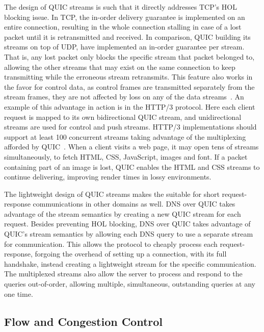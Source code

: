 \documentclass[english, 12pt, a4paper, elec, utf8, a-2b, online]{aaltothesis}
\begin{document}
The design of QUIC streams is such that it directly addresses TCP's HOL blocking
issue. In TCP, the in-order delivery guarantee is implemented on an entire connection,
resulting in the whole connection stalling in case of a lost packet until it is
retransmitted and received. In comparison, QUIC building its streams on top of
UDP, have implemented an in-order guarantee per stream. That is, any lost packet
only blocks the specific stream that packet belonged to, allowing the other streams
that may exist on the same connection to keep transmitting while the erroneous
stream retransmits. This feature also works in the favor for control data,
as control frames are transmitted separately from the stream frames, they are not
affected by loss on any of the data streams~\cite{rfc9000}. An example of this advantage
in action is in the HTTP/3 protocol. Here each client request is mapped to its own
bidirectional QUIC stream, and unidirectional streams are used for control and
push streams. HTTP/3 implementations should support at least 100 concurrent streams
taking advantage of the multiplexing afforded by QUIC~\cite{rfc9114}. When a client
visits a web page, it may open tens of streams simultaneously, to fetch HTML, CSS,
JavaScript, images and font. If a packet containing part of an image is lost, QUIC
enables the HTML and CSS streams to continue delivering, improving render times
in lossy environments.

The lightweight  design of QUIC streams makes the suitable for short request-response
communications in other domains as well. DNS over QUIC takes advantage of the
stream semantics by creating a new QUIC stream for each request. Besides preventing
HOL blocking, DNS over QUIC takes advantage of QUIC's stream semantics by allowing
each DNS query to use a separate stream for communication. This allows the protocol
to cheaply process each request-response, forgoing the overhead of setting up a connection,
with its full handshake, instead creating a lightweight stream for the specific
communication. The multiplexed streams also allow the server to process and respond
to the queries out-of-order, allowing multiple, simultaneous, outstanding queries
at any one time.

\subsection{Flow and Congestion Control}
\end{document}
